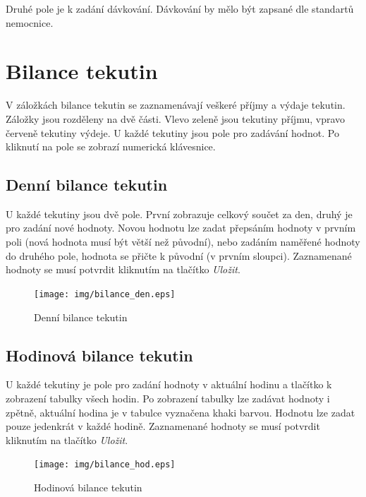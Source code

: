 Druhé pole je k zadání dávkování. Dávkování by mělo být zapsané dle standartů nemocnice.


\section{Bilance tekutin}

V záložkách bilance tekutin se zaznamenávají veškeré příjmy a výdaje tekutin. Záložky jsou rozděleny na dvě části. Vlevo zeleně jsou tekutiny příjmu, vpravo červeně tekutiny výdeje. U každé tekutiny jsou pole pro zadávání hodnot. Po kliknutí na pole se zobrazí numerická klávesnice.


\subsection{Denní bilance tekutin}

U každé tekutiny jsou dvě pole. První zobrazuje celkový součet za den, druhý je pro zadání nové hodnoty. Novou hodnotu lze zadat přepsáním hodnoty v prvním poli (nová hodnota musí být větší než původní), nebo zadáním naměřené hodnoty do druhého pole, hodnota se přičte k původní (v prvním sloupci). Zaznamenané hodnoty se musí potvrdit kliknutím na tlačítko \emph{Uložit}.

\begin{figure}[H]
	\centering
	\texttt{[image: img/bilance\_den.eps]}
	\caption{Denní bilance tekutin}
  \label{fig:bilance}
\end{figure}

\subsection{Hodinová bilance tekutin}

U každé tekutiny je pole pro zadání hodnoty v aktuální hodinu a tlačítko k zobrazení tabulky všech hodin. Po zobrazení tabulky lze zadávat hodnoty i zpětně, aktuální hodina je v tabulce vyznačena khaki barvou. Hodnotu lze zadat pouze jedenkrát v každé hodině. Zaznamenané hodnoty se musí potvrdit kliknutím na tlačítko \emph{Uložit}.

\begin{figure}[H]
	\centering
	\texttt{[image: img/bilance\_hod.eps]}
	\caption{Hodinová bilance tekutin}
  \label{fig:bilance_hod}
\end{figure}

